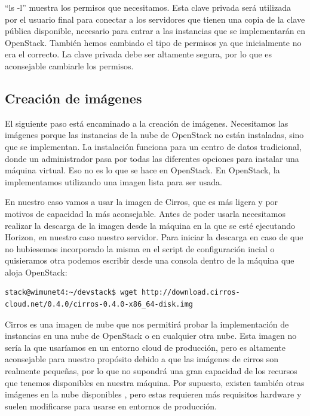 “ls -l” muestra los permisos que necesitamos. Esta clave privada será utilizada por el usuario final para conectar a los servidores que tienen una copia de la clave pública disponible, necesario para entrar a las instancias que se implementarán en OpenStack. También hemos cambiado el tipo de permisos ya que inicialmente no era el correcto. La clave privada debe ser altamente segura, por lo que es aconsejable cambiarle los permisos.

\subsection{Creación de imágenes}
El siguiente paso está encaminado a la creación de imágenes. Necesitamos las imágenes porque las instancias de la nube de OpenStack no están instaladas, sino que se implementan. La instalación funciona para un centro de datos tradicional, donde un administrador pasa por todas las diferentes opciones para instalar una máquina virtual. Eso no es lo que se hace en OpenStack. En OpenStack, la implementamos utilizando una imagen lista para ser usada.

En nuestro caso vamos a usar la imagen de Cirros, que es más ligera y por motivos de capacidad la más aconsejable. Antes de poder usarla necesitamos realizar la descarga de la imagen desde la máquina en la que se esté ejecutando Horizon, en nuestro caso nuestro servidor. Para iniciar la descarga en caso de que no hubiesemos incorporado la misma en el script de configuración incial o quisieramos otra podemos escribir desde una consola dentro de la máquina que aloja OpenStack:

\begin{lstlisting}[style=Consola]
stack@wimunet4:~/devstack$ wget http://download.cirros-cloud.net/0.4.0/cirros-0.4.0-x86_64-disk.img
\end{lstlisting}

Cirros es una imagen de nube que nos permitirá probar la implementación de instancias en una nube de OpenStack o en cualquier otra nube. Esta imagen no sería la que usaríamos en un entorno cloud de producción, pero es altamente aconsejable para nuestro propósito debido a que las imágenes de cirros son realmente pequeñas, por lo que no supondrá una gran capacidad de los recursos que tenemos disponibles en nuestra máquina. Por supuesto, existen también otras imágenes en la nube disponibles \cite{noauthor_openstack_nodate-7}, pero estas requieren más requisitos hardware y suelen modificarse para usarse en entornos de producción.

